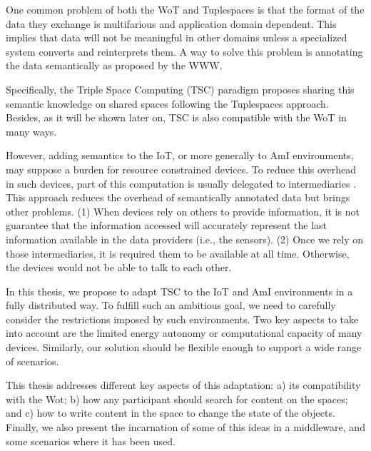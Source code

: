 \medskip

One common problem of both the WoT and Tuplespaces is that the format of the data they exchange is multifarious and application domain dependent.
This implies that data will not be meaningful in other domains unless a specialized system converts and reinterprets them.
A way to solve this problem is annotating the data semantically as proposed by the WWW. %

Specifically, the Triple Space Computing (TSC) paradigm proposes sharing this semantic knowledge on shared spaces following the Tuplespaces approach.
Besides, as it will be shown later on, TSC is also compatible with the WoT in many ways.

However, adding semantics to the IoT, or more generally to AmI environments, may suppose a burden for resource constrained devices.
To reduce this overhead in such devices, part of this computation is usually delegated to intermediaries \citep{honkola_smart-m3_2010}. %
This approach reduces the overhead of semantically annotated data but brings other problems.
(1) When devices rely on others to provide information, it is not guarantee that the information accessed will accurately represent the last information available in the data providers (i.e., the sensors).
(2) Once we rely on those intermediaries, it is required them to be available at all time.
Otherwise, the devices would not be able to talk to each other.

In this thesis, we propose to adapt TSC to the IoT and AmI environments in a fully distributed way.
To fulfill such an ambitious goal, we need to carefully consider the restrictions imposed by such environments.
Two key aspects to take into account are the limited energy autonomy or computational capacity of many devices.
Similarly, our solution should be flexible enough to support a wide range of scenarios.

This thesis addresses different key aspects of this adaptation:
a) its compatibility with the Wot;
b) how any participant should search for content on the spaces;
and c) how to write content in the space to change the state of the objects.
Finally, we also present the incarnation of some of this ideas in a middleware,
and some scenarios where it has been used.